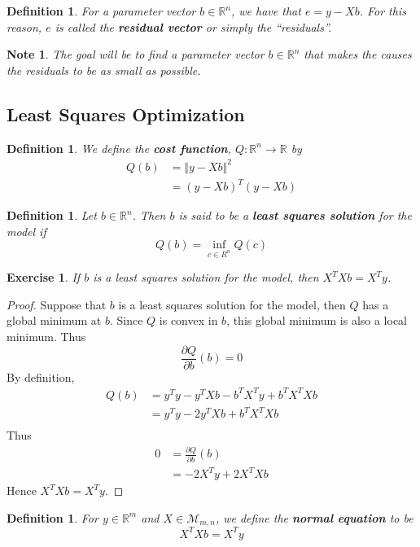 \documentclass[12pt]{amsart}
\newtheorem{defn}[thm]{Definition}
\newtheorem{note}[thm]{Note}
\newtheorem{ex}[thm]{Exercise}
\newcommand{\R}{\mathbb{R}}
\newcommand{\MM}{\mathcal{M}}
\newcommand{\n}{\Vert}
\begin{document}
\begin{defn}
For a parameter vector $b \in \R^n$, we have that  $e = y-Xb$. For this reason, $e$ is called the \textbf{residual vector} or simply the ``residuals''.
\end{defn}

\begin{note}
The goal will be to find a parameter vector $b \in \R^n$ that makes the causes the residuals to be as small as possible.  
\end{note}

\subsection{Least Squares Optimization}

\begin{defn}
We define the \textbf{cost function}, $Q: \R^n \rightarrow \R$ by 
\begin{align*}
Q(b) 
&= \n y - Xb \n ^2 \\
&= (y - Xb )^T(y - Xb )
\end{align*}
\end{defn}

\begin{defn}
Let $b \in \R^n$. Then $b$ is said to be a \textbf{least squares solution} for the model if $$Q(b) = \inf_{c \in R^{n}} Q(c)$$ 
\end{defn}

\begin{ex}
If $b$ is a least squares solution for the model, then $X^TXb = X^Ty$.
\end{ex}

\begin{proof}
Suppose that $b$ is a least squares solution for the model, then $Q$ has a global minimum at $b$. Since $Q$ is convex in $b$, this global minimum is also a local minimum. Thus $$\frac{\partial Q}{\partial b}(b) = 0$$ By definition, 
\begin{align*}
Q(b) 
&= y^Ty -y^TXb - b^TX^Ty + b^TX^TXb \\
&= y^Ty -2y^TXb + b^TX^TXb \\ 
\end{align*}
Thus 
\begin{align*}
0
&= \frac{\partial Q}{\partial b}(b) \\
&= -2X^Ty + 2X^TXb
\end{align*}
Hence $X^TXb = X^Ty$.
\end{proof}

\begin{defn}
For $y \in \R^m$ and $X \in \MM_{m,n}$, we define the \textbf{normal equation} to be $$X^TXb = X^Ty$$
\end{defn}
\end{document}
